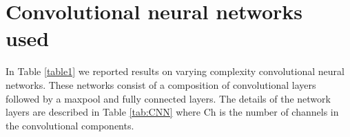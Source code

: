 






\section{Convolutional neural networks used} \label{appendix:CNNs}
In Table \ref{table1} we reported results on varying complexity convolutional neural networks. These networks consist of a composition of convolutional layers followed by a maxpool and fully connected layers. 
The details of the network layers are described in Table \ref{tab:CNN} where Ch is the number of channels in the convolutional components. %

